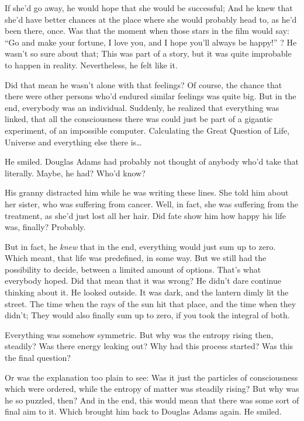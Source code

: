 If she'd go away, he would hope that she would be successful; And he knew that she'd have better chances at the place where she would probably head to, as he'd been there, once. 
Was that the moment when those stars in the film would say: \enquote{Go and make your fortune, I love you, and I hope you'll always be happy!} ?
He wasn't so sure about that; This was part of a story, but it was quite improbable to happen in reality. 
Nevertheless, he felt like it.

Did that mean he wasn't alone with that feelings?
Of course, the chance that there were other persons who'd endured similar feelings was quite big. 
But in the end, everybody was an individual. 
Suddenly, he realized that everything was linked, that all the consciousness there was could just be part of a gigantic experiment, of an impossible computer. 
Calculating the Great Question of Life, Universe and everything else there is\dots{}

He smiled.
Douglas Adams had probably not thought of anybody who'd take that literally. 
Maybe, he had?
Who'd know?

His granny distracted him while he was writing these lines. 
She told him about her sister, who was suffering from cancer. 
Well, in fact, she was suffering from the treatment, as she'd just lost all her hair. 
Did fate show him how happy his life was, finally?
Probably.

But in fact, he \emph{knew} that in the end, everything would just sum up to zero. 
Which meant, that life was predefined, in some way. But we still had the possibility to decide, between a limited amount of options. 
That's what everybody hoped. 
Did that mean that it was wrong?
He didn't dare continue thinking about it. 
He looked outside. It was dark, and the lantern dimly lit the street. The time when the rays of the sun hit that place, and the time when they didn't; They would also finally sum up to zero, if you took the integral of both.

Everything was somehow symmetric. 
But why was the entropy rising then, steadily?
Was there energy leaking out?
Why had this process started?
Was this the final question?

Or was the explanation too plain to see: Was it just the particles of consciousness which were ordered, while the entropy of matter was steadily rising?
But why was he so puzzled, then?
And in the end, this would mean that there was some sort of final aim to it. 
Which brought him back to Douglas Adams again. 
He smiled.

